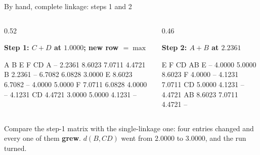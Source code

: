 \documentclass[aspectratio=169]{beamer}
\begin{document}
\begin{frame}[fragile,shrink=5]{By hand, complete linkage: steps 1 and 2}
  \begin{columns}[T]
    \begin{column}{0.52\textwidth}
      \begin{center}\small\textbf{Step 1: $C{+}D$ at $1.0000$; new row $= \max$}\end{center}
\begin{outblk}
                   A         B         E         F        CD
A                 --    2.2361    8.6023    7.0711    4.4721
B             2.2361        --    6.7082    6.0828    3.0000
E             8.6023    6.7082        --    4.0000    5.0000
F             7.0711    6.0828    4.0000        --    4.1231
CD            4.4721    3.0000    5.0000    4.1231        --
\end{outblk}
    \end{column}
    \begin{column}{0.46\textwidth}
      \begin{center}\small\textbf{Step 2: $A{+}B$ at $2.2361$}\end{center}
\begin{outblk}
                   E         F        CD        AB
E                 --    4.0000    5.0000    8.6023
F             4.0000        --    4.1231    7.0711
CD            5.0000    4.1231        --    4.4721
AB            8.6023    7.0711    4.4721        --
\end{outblk}
    \end{column}
  \end{columns}
  \vspace{0.3em}
  \begin{center}\small
    Compare the step-1 matrix with the single-linkage one: four entries
    changed and every one of them \textbf{grew}. $d(B,CD)$ went from $2.0000$
    to $3.0000$, and the run turned.
  \end{center}
\end{frame}
\end{document}
